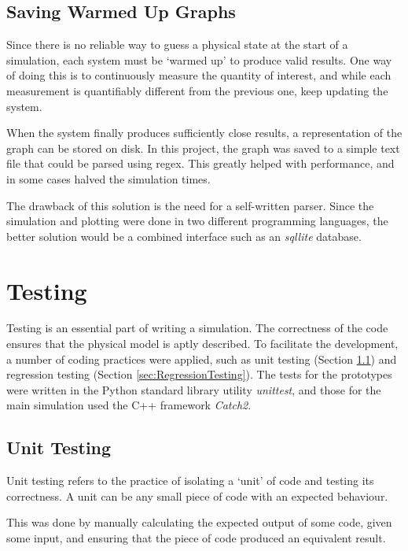 \subsection{Saving Warmed Up Graphs}
\label{subsec:SavingWarmedUpGraphs}

Since there is no reliable way to guess a physical state at the start of a simulation, each system must be `warmed up' to produce valid results. One way of doing this is to continuously measure the quantity of interest, and while each measurement is quantifiably different from the previous one, keep updating the system.

When the system finally produces sufficiently close results, a representation of the graph can be stored on disk. In this project, the graph was saved to a simple text file that could be parsed using regex. This greatly helped with performance, and in some cases halved the simulation times.

The drawback of this solution is the need for a self-written parser. Since the simulation and plotting were done in two different programming languages, the better solution would be a combined interface such as an \textit{sqllite} database.

\section{Testing}
\label{sec:Testing}

Testing is an essential part of writing a simulation. The correctness of the code ensures that the physical model is aptly described. To facilitate the development, a number of coding practices were applied, such as unit testing (Section \ref{sec:UnitTesting}) and regression testing (Section \ref{sec:RegressionTesting}). The tests for the prototypes were written in the Python standard library utility \textit{unittest}, and those for the main simulation used the C++ framework \textit{Catch2}.

\subsection{Unit Testing}
\label{sec:UnitTesting}

Unit testing refers to the practice of isolating a `unit' of code and testing its correctness. A unit can be any small piece of code with an expected behaviour.

This was done by manually calculating the expected output of some code, given some input, and ensuring that the piece of code produced an equivalent result.

